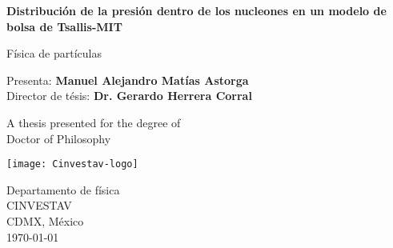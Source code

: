 \begin{titlepage}
    \begin{center}
        \vspace*{1cm}
        
        \Huge
        \textbf{Distribución de la presión dentro de los nucleones en un modelo de bolsa de Tsallis-MIT}
        
        \vspace{0.5cm}
        \LARGE
        Física de partículas
        
        \vspace{1.5cm}
        
        Presenta: \textbf{Manuel Alejandro Matías Astorga} \\
        Director de tésis: \textbf{Dr. Gerardo Herrera Corral}
        
        \vfill
        
        A thesis presented for the degree of\\
        Doctor of Philosophy
        
        \vspace{0.8cm}
        
        \texttt{[image: Cinvestav-logo]}
        
        \Large
        Departamento de física\\
        CINVESTAV\\
        CDMX, México\\
        \today
        
    \end{center}
\end{titlepage}